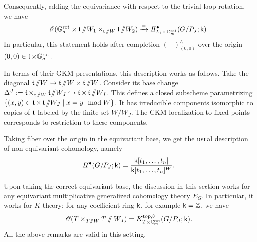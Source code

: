 \begin{remark}\label{remark: finite flag varieties with trivial loop rotation}
Consequently, adding the equivariance with respect to the trivial loop rotation, we have
\begin{equation*}
   \operatorname{\mathscr{O}}(\mathbb{G}_a^{\mathrm{rot}} \times \operatorname{\mathfrak{t}} \sslash W_1 \times_{\operatorname{\mathfrak{t}} \sslash W} \operatorname{\mathfrak{t}} \sslash W_2) \xrightarrow{=} H^{\bullet}_{L_1 \times \mathbb{G}_m^{\mathrm{rot}}}(G/P_J; \mathsf{k}). 
\end{equation*}
In particular, this statement holds after completion $(-)^{\wedge}_{(0, 0)}$ over the origin $(0,0) \in \operatorname{\mathfrak{t}} \times \mathbb{G}_a^{\mathrm{rot}}$.
\end{remark}

\begin{remark}\label{remark: GKM for cohomology of finite flag varieties}
In terms of their GKM presentations, this description works as follows. Take the diagonal $\operatorname{\mathfrak{t}}\sslash W \hookrightarrow \operatorname{\mathfrak{t}} \sslash W \times \operatorname{\mathfrak{t}} \sslash W$. Consider its base change $\Delta^J := \operatorname{\mathfrak{t}} \times_{\operatorname{\mathfrak{t}}\sslash W} \operatorname{\mathfrak{t}}\sslash W_J \hookrightarrow \operatorname{\mathfrak{t}} \times \operatorname{\mathfrak{t}}\sslash W_J$. This defines a closed subscheme parametrizing $\{ (x, y) \in \operatorname{\mathfrak{t}} \times \operatorname{\mathfrak{t}} \sslash W_J \mid x = y \mod W  \}$. It has irreducible components isomorphic to copies of $\operatorname{\mathfrak{t}}$ labeled by the finite set $W/W_J$. The GKM localization to fixed-points corresponds to restriction to these components. 
\end{remark}


\begin{remark}\label{remark: cohomology of finite flag varietes as coinvariant algebra}
Taking fiber over the origin in the equivariant base, we get the usual description of non-equivariant cohomology, namely
\begin{equation*}
    H^{\bullet}(G/P_J; \mathsf{k}) = \frac{\mathsf{k}[t_1, \dots, t_n]}{\mathsf{k}[t_1, \dots, t_n]^W}. 
\end{equation*}
\end{remark}


\begin{remark}
Upon taking the correct equivariant base, the discussion in this section works for any equivariant multiplicative generalized cohomology theory $E_G$. In particular, it works for $K$-theory: for any coefficient ring $\mathsf{k}$, for example $\mathsf{k}=\operatorname{\mathbb{Z}}$, we have
\begin{equation*}
    \operatorname{\mathscr{O}}(T \times_{T \sslash W} T \sslash W_J) = K^{\mathrm{top}, 0}_{T \times \mathbb{G}_m^{\mathrm{rot}}}(G/P_J; \mathsf{k}).
\end{equation*}
All the above remarks are valid in this setting.
\end{remark}









